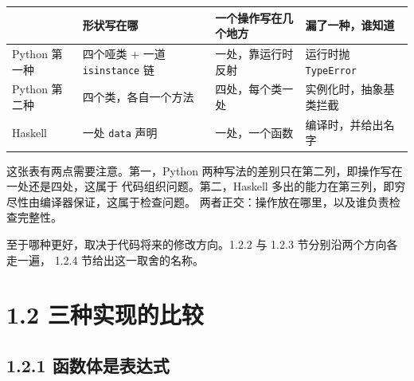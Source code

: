 {\def\LTcaptype{none} %
\begin{longtable}[]{@{}
  >{\raggedright\arraybackslash}p{}
  >{\raggedright\arraybackslash}p{}
  >{\raggedright\arraybackslash}p{}
  >{\raggedright\arraybackslash}p{}@{}}
\toprule\noalign{}
\begin{minipage}[b]{\linewidth}\raggedright
\end{minipage} & \begin{minipage}[b]{\linewidth}\raggedright
形状写在哪
\end{minipage} & \begin{minipage}[b]{\linewidth}\raggedright
一个操作写在几个地方
\end{minipage} & \begin{minipage}[b]{\linewidth}\raggedright
漏了一种，谁知道
\end{minipage} \\
\midrule\noalign{}
\endhead
\bottomrule\noalign{}
\endlastfoot
Python 第一种 & 四个哑类 + 一道 \passthrough{\lstinline!isinstance!} 链 & 一处，靠运行时反射 & 运行时抛 \passthrough{\lstinline!TypeError!} \\
Python 第二种 & 四个类，各自一个方法 & 四处，每个类一处 & 实例化时，抽象基类拦截 \\
Haskell & 一处 \passthrough{\lstinline!data!} 声明 & 一处，一个函数 & 编译时，并给出名字 \\
\end{longtable}
}

这张表有两点需要注意。第一，Python 两种写法的差别只在第二列，即操作写在一处还是四处，这属于
代码组织问题。第二，Haskell 多出的能力在第三列，即穷尽性由编译器保证，这属于检查问题。
两者正交：操作放在哪里，以及谁负责检查完整性。

至于哪种更好，取决于代码将来的修改方向。1.2.2 与 1.2.3 节分别沿两个方向各走一遍，
1.2.4 节给出这一取舍的名称。

\section{1.2 三种实现的比较}\label{ux4e09ux79cdux5b9eux73b0ux7684ux6bd4ux8f83}

\subsection{1.2.1 函数体是表达式}\label{ux51fdux6570ux4f53ux662fux8868ux8fbeux5f0f}


